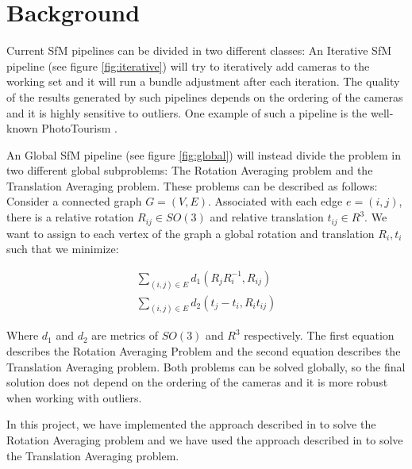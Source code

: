 \documentclass[conference, 12pt]{acmsiggraph}
\begin{document}
\section{Background}

Current SfM pipelines can be divided in two different classes: An Iterative SfM pipeline (see figure \ref{fig:iterative}) will try to iteratively add cameras to the working set and it will run a bundle adjustment after each iteration. The quality of the results generated by such pipelines depends on the ordering of the cameras and it is highly sensitive to outliers. One example of such a pipeline is the well-known PhotoTourism \cite{snavely2006photo}.

An Global SfM pipeline (see figure \ref{fig:global}) will instead divide the problem in two different global subproblems: The Rotation Averaging problem and the Translation Averaging problem. These problems can be described as follows: Consider a connected graph $G = (V,E)$. Associated with each edge $e = (i, j)$, there is a relative rotation $R_{ij} \in SO(3)$ and relative translation $t_{ij} \in R^3$. We want to assign to each vertex of the graph a global rotation and translation $R_i, t_i$ such that we minimize:

\begin{eqnarray}
	\sum_{(i,j) \in E} d_1(R_{j}R_{i}^{-1}, R_{ij}) \\
	\sum_{(i,j) \in E} d_2(t_{j}-t_{i}, R_{i}t_{ij})
\end{eqnarray}

Where $d_1$ and $d_2$ are metrics of $SO(3)$ and $R^3$ respectively. The first equation describes the Rotation Averaging Problem and the second equation describes the Translation Averaging problem. Both problems can be solved globally, so the final solution does not depend on the ordering of the cameras and it is more robust when working with outliers.

In this project, we have implemented the approach described in \cite{rotation} to solve the Rotation Averaging problem and we have used the approach described in \cite{translation} to solve the Translation Averaging problem. 
\end{document}
